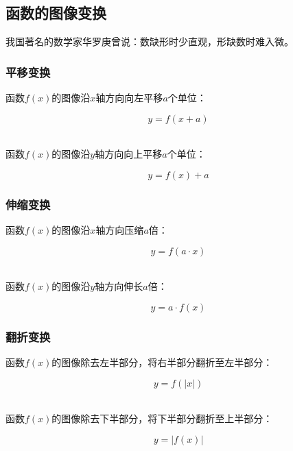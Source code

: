 \documentclass[UTF8]{ctexart}
\begin{document}
\newpage

\subsection{函数的图像变换}
    我国著名的数学家华罗庚曾说：数缺形时少直观，形缺数时难入微。

\subsubsection{平移变换}
    函数$f(x)$的图像沿$x$轴方向向左平移$a$个单位：
    \begin{large}
        \begin{equation*}
            y=f(x+a)
        \end{equation*}
    \end{large}\\
    函数$f(x)$的图像沿$y$轴方向向上平移$a$个单位：
    \begin{large}
        \begin{equation*}
            y=f(x)+a
        \end{equation*}
    \end{large}

\subsubsection{伸缩变换}
    函数$f(x)$的图像沿$x$轴方向压缩$a$倍：
    \begin{large}
        \begin{equation*}
            y=f(a\cdot x)
        \end{equation*}
    \end{large}\\
    函数$f(x)$的图像沿$y$轴方向伸长$a$倍：
    \begin{large}
        \begin{equation*}
            y=a\cdot f(x)
        \end{equation*}
    \end{large}

\subsubsection{翻折变换}
    函数$f(x)$的图像除去左半部分，将右半部分翻折至左半部分：
    \begin{large}
        \begin{equation*}
            y=f(\big|x\big|)
        \end{equation*}
    \end{large}\\
    函数$f(x)$的图像除去下半部分，将下半部分翻折至上半部分：
    \begin{large}
        \begin{equation*}
            y=\big|f(x)\big|
        \end{equation*}
    \end{large}\\
\end{document}
